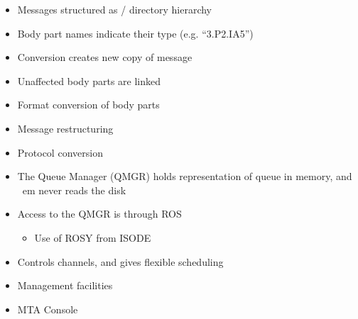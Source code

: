 \begin {bwslide}
\begin {itemize}
\item Messages structured as \unix/ directory hierarchy

\item Body part names indicate their type (e.g. ``3.P2.IA5'')

\item Conversion creates new copy of message

\item Unaffected body parts  are linked

\item Format conversion of body parts

\item Message restructuring

\item Protocol conversion
\end {itemize}

\end {bwslide}


\begin {bwslide}

\begin {itemize}
\item The Queue Manager (QMGR) holds representation of queue in memory, and {\
em
never} reads the disk

\item Access to the QMGR is through ROS
\begin {itemize}
\item Use of ROSY from ISODE
\end {itemize}

\item Controls channels, and gives flexible scheduling

\item Management facilities

\item MTA Console
\end {itemize}


\end {bwslide}


